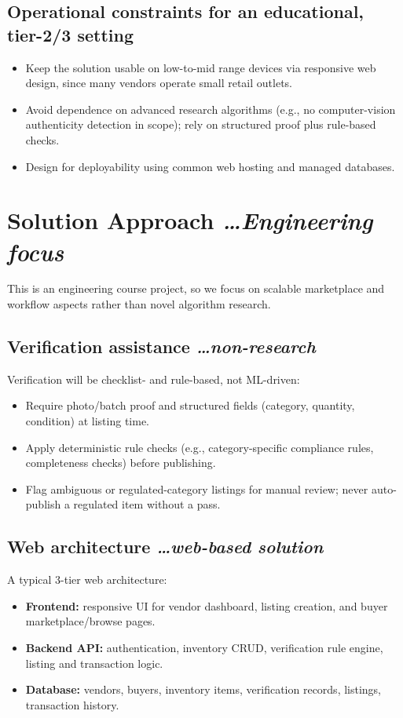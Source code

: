 \documentclass[11pt,a4paper]{article}
\newcommand{\BvrHint}[1]{%
  {\normalfont\normalsize\itshape\hfill #1}}
\begin{document}
\subsection{Operational constraints for an educational, tier-2/3 setting}
\begin{itemize}[leftmargin=0.7cm]
    \item Keep the solution usable on low-to-mid range devices via responsive web design, since many vendors operate small retail outlets.
    \item Avoid dependence on advanced research algorithms (e.g., no computer-vision authenticity detection in scope); rely on structured proof plus rule-based checks.
    \item Design for deployability using common web hosting and managed databases.
\end{itemize}

\section{Solution Approach %
\BvrHint{\ldots Engineering focus}}
This is an engineering course project, so we focus on
scalable marketplace and workflow aspects rather than
novel algorithm research.

\subsection{Verification assistance %
\BvrHint{\ldots non-research}}
Verification will be checklist- and rule-based, not
ML-driven:
\begin{itemize}[leftmargin=0.7cm]
    \item Require photo/batch proof and structured fields (category, quantity, condition) at listing time.
    \item Apply deterministic rule checks (e.g., category-specific compliance rules, completeness checks) before publishing.
    \item Flag ambiguous or regulated-category listings for manual review; never auto-publish a regulated item without a pass.
\end{itemize}

\subsection{Web architecture %
\BvrHint{\ldots web-based solution}}
A typical 3-tier web architecture:
\begin{itemize}[leftmargin=0.7cm]
    \item \textbf{Frontend:} responsive UI for vendor dashboard, listing creation, and buyer marketplace/browse pages.
    \item \textbf{Backend API:} authentication, inventory CRUD, verification rule engine, listing and transaction logic.
    \item \textbf{Database:} vendors, buyers, inventory items, verification records, listings, transaction history.
\end{itemize}
\end{document}
